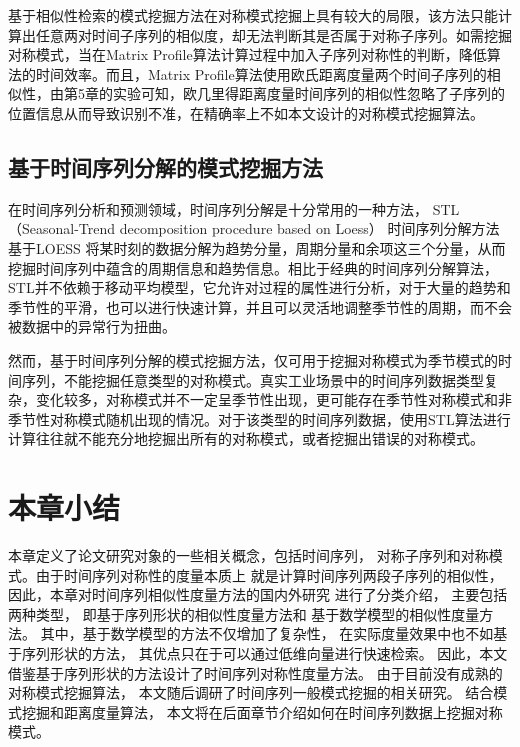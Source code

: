 基于相似性检索的模式挖掘方法在对称模式挖掘上具有较大的局限，该方法只能计算出任意两对时间子序列的相似度，却无法判断其是否属于对称子序列。如需挖掘对称模式，当在Matrix Profile算法计算过程中加入子序列对称性的判断，降低算法的时间效率。而且，Matrix Profile算法使用欧氏距离度量两个时间子序列的相似性，由第5章的实验可知，欧几里得距离度量时间序列的相似性忽略了子序列的位置信息从而导致识别不准，在精确率上不如本文设计的对称模式挖掘算法。

\subsection{基于时间序列分解的模式挖掘方法}
在时间序列分析和预测领域，时间序列分解是十分常用的一种方法，
STL（Seasonal-Trend decomposition procedure based on Loess）\cite{DBLP:conf/www/BayardoMS07}
时间序列分解方法基于LOESS\cite{DBLP:books/lib/HastieTF09}
将某时刻的数据分解为趋势分量，周期分量和余项这三个分量，从而挖掘时间序列中蕴含的周期信息和趋势信息。相比于经典的时间序列分解算法，STL并不依赖于移动平均模型，它允许对过程的属性进行分析，对于大量的趋势和季节性的平滑，也可以进行快速计算，并且可以灵活地调整季节性的周期，而不会被数据中的异常行为扭曲。

然而，基于时间序列分解的模式挖掘方法，仅可用于挖掘对称模式为季节模式的时间序列，不能挖掘任意类型的对称模式。真实工业场景中的时间序列数据类型复杂，变化较多，对称模式并不一定呈季节性出现，更可能存在季节性对称模式和非季节性对称模式随机出现的情况。对于该类型的时间序列数据，使用STL算法进行计算往往就不能充分地挖掘出所有的对称模式，或者挖掘出错误的对称模式。

\section{本章小结}
本章定义了论文研究对象的一些相关概念，包括时间序列，
对称子序列和对称模式。由于时间序列对称性的度量本质上
就是计算时间序列两段子序列的相似性，
因此，本章对时间序列相似性度量方法的国内外研究
进行了分类介绍，
主要包括两种类型，
即基于序列形状的相似性度量方法和
基于数学模型的相似性度量方法。
其中，基于数学模型的方法不仅增加了复杂性，
在实际度量效果中也不如基于序列形状的方法，
其优点只在于可以通过低维向量进行快速检索。
因此，本文借鉴基于序列形状的方法设计了时间序列对称性度量方法。
由于目前没有成熟的对称模式挖掘算法，
本文随后调研了时间序列一般模式挖掘的相关研究。
结合模式挖掘和距离度量算法，
本文将在后面章节介绍如何在时间序列数据上挖掘对称模式。